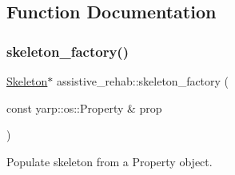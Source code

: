 \subsection{Function Documentation}
\mbox{\label{group__skeleton_gafe9fe27bb8b50a0843b93dfbb5c571b1}} 
\subsubsection{\texorpdfstring{skeleton\_factory()}{skeleton\_factory()}}
{\footnotesize\ttfamily \mbox{\hyperlink{classassistive__rehab_1_1Skeleton}{Skeleton}}$\ast$ assistive\+\_\+rehab\+::skeleton\+\_\+factory (\begin{DoxyParamCaption}\item[{const yarp\+::os\+::\+Property \&}]{prop }\end{DoxyParamCaption})}



Populate skeleton from a Property object. 



